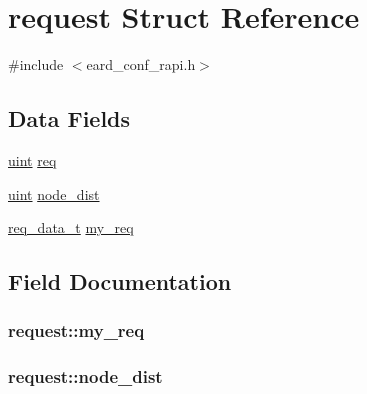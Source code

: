 \hypertarget{structrequest}{}\section{request Struct Reference}
\label{structrequest}


{\ttfamily \#include $<$eard\+\_\+conf\+\_\+rapi.\+h$>$}

\subsection*{Data Fields}
\begin{DoxyCompactItemize}
\item 
\hyperlink{generic_8h_a91ad9478d81a7aaf2593e8d9c3d06a14}{uint} \hyperlink{structrequest_a876777560756f3c5dd530a47168cae79}{req}
\item 
\hyperlink{generic_8h_a91ad9478d81a7aaf2593e8d9c3d06a14}{uint} \hyperlink{structrequest_a37f1531c9b39da65d6756a37f93937de}{node\+\_\+dist}
\item 
\hyperlink{eard__conf__rapi_8h_a8e11ed6a146d5be9a0067ef5b147b5fb}{req\+\_\+data\+\_\+t} \hyperlink{structrequest_a5450814d1f085239f22a19900f6c0e96}{my\+\_\+req}
\end{DoxyCompactItemize}


\subsection{Field Documentation}
\subsubsection[{\texorpdfstring{my\+\_\+req}{my_req}}]{ request\+::my\+\_\+req}\hypertarget{structrequest_a5450814d1f085239f22a19900f6c0e96}{}\label{structrequest_a5450814d1f085239f22a19900f6c0e96}
\subsubsection[{\texorpdfstring{node\+\_\+dist}{node_dist}}]{ request\+::node\+\_\+dist}\hypertarget{structrequest_a37f1531c9b39da65d6756a37f93937de}{}\label{structrequest_a37f1531c9b39da65d6756a37f93937de}
